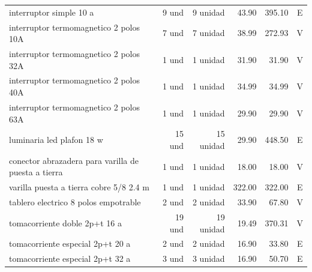 \begin{landscape}
\begin{longtable}{p{8.0cm}r r r r c}
interruptor simple 10 a & 9 und & 9 unidad & 43.90 & 395.10 & E \\
interruptor termomagnetico 2 polos 10A & 7 und & 7 unidad & 38.99 & 272.93 & V \\
interruptor termomagnetico 2 polos 32A & 1 und & 1 unidad & 31.90 & 31.90 & V \\
interruptor termomagnetico 2 polos 40A & 1 und & 1 unidad & 34.99 & 34.99 & V \\
interruptor termomagnetico 2 polos 63A & 1 und & 1 unidad & 29.90 & 29.90 & V \\
luminaria led plafon 18 w & 15 und & 15 unidad & 29.90 & 448.50 & E \\
conector abrazadera para varilla de puesta a tierra & 1 und & 1 unidad & 18.00 & 18.00 & V \\
varilla puesta a tierra cobre 5/8 2.4 m & 1 und & 1 unidad & 322.00 & 322.00 & E \\
tablero electrico 8 polos empotrable & 2 und & 2 unidad & 33.90 & 67.80 & V \\
tomacorriente doble 2p+t 16 a & 19 und & 19 unidad & 19.49 & 370.31 & V \\
tomacorriente especial 2p+t 20 a & 2 und & 2 unidad & 16.90 & 33.80 & E \\
tomacorriente especial 2p+t 32 a & 3 und & 3 unidad & 16.90 & 50.70 & E \\
\bottomrule\end{longtable}\normalsize\end{landscape}
